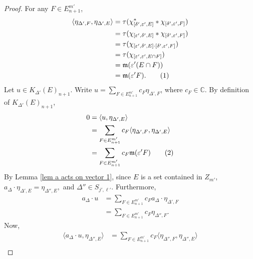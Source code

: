 \documentclass[12pt]{amsart}
\newcommand{\mf}[1]{\mathfrak{#1}}
\newcommand{\C}{\mathbb{C}}
\newcommand{\de}{\delta}
\newcommand{\De}{\Delta}
\newcommand{\ep}{\varepsilon}
\theoremstyle{plain} %
\theoremstyle{definition} %
\begin{document}
\begin{proof}
For any $F \in E_{n+1}^{m'}$,
\begin{align*}
    \langle \eta_{\De', F}, \eta_{\De', E} \rangle &= \tau(\chi_{[\de',\ep',E]}^* * \chi_{[\de', \ep', F]})\\
    &= \tau(\chi_{[\ep',\de',E]} * \chi_{[\de', \ep', F]})\\
    &= \tau(\chi_{[\ep',\de',E]\cdot[\de', \ep', F]})\\
    &= \tau(\chi_{[\ep',\ep',E\cap F]})\\
    &= \mf{m}(\ep'(E\cap F))\\
    &= \mf{m}(\ep' F). \stepcounter{equation}\tag{\theequation}\label{eq0 thm a acts on K 1}
\end{align*}
Let $u \in K_{\De'}(E)_{n+1}$. Write $u = \sum_{F \in E^{m'}_{n+1}} c_F \eta_{\De', F}$, where $c_F \in \C$.
By definition of $K_{\De'}(E)_{n+1}$, 
\begin{align*}
    0&= \langle u, \eta_{\De', E}\rangle\\
    &= \sum_{F \in E_{n+1}^{m'}} c_F \langle \eta_{\De', F}, \eta_{\De', E} \rangle\\
    &= \sum_{F \in E_{n+1}^{m'}} c_F \mf{m}(\ep' F) \stepcounter{equation}\tag{\theequation}\label{eq1 thm a acts on K 1}
\end{align*}
By Lemma \ref{lem a acts on vector 1}, since $E$ is a set contained in $Z_{m'}$, $a_{\De} \cdot \eta_{\De',E} = \eta_{\De'', E},$ and $\De'' \in S_{j',\ell'}$. Furthermore,
\begin{align*}
    a_{\De} \cdot u &= \sum_{F \in E^{m'}_{n+1}} c_F a_{\De} \cdot \eta_{\De', F}\\
    &= \sum_{F \in E^{m'}_{n+1}} c_F \eta_{\De'', F}.
\end{align*}
Now, 
\begin{align*}
    \langle a_{\De} \cdot u, \eta_{\De'',E} \rangle &= \sum_{F \in E^{m'}_{n+1}} c_F \langle \eta_{\De'', F}, \eta_{\De'',E}\rangle \\

\end{align*}
\end{proof}
\end{document}
